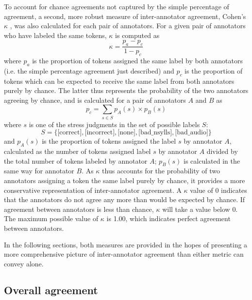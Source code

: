 		To account for chance agreements not captured by the simple percentage of agreement, a second, more robust measure of inter-annotator agreement, Cohen's $\kappa$ \citep{Cohen1960}, was also calculated for each pair of annotators. For a given pair of annotators who have labeled the same tokens, $\kappa$ is computed as
		\[
		\kappa = \frac{p_a-p_c}{1-p_c}
		\]
		where $p_a$ is the proportion of tokens assigned the same label by both annotators (i.e. the simple percentage agreement just described) and $p_c$ is the proportion of tokens which can be expected to receive the same label from both annotators purely by chance. The latter thus represents the probability of the two annotators agreeing by chance, and is calculated for a pair of annotators $A$ and $B$ as
		\[
		p_c = \sum_{s \in S} p_A(s) \times p_B(s)
		\]
		where $s$ is one of the stress judgments in the set of possible labels $S$:
		\[S = \{\text{[correct]}, \text{[incorrect]}, \text{[none]}, \text{[bad\_nsylls]}, \text{[bad\_audio]}\}\]
		and $p_A(s)$ is the proportion of tokens assigned the label $s$ by annotator $A$, calculated as the number of tokens assigned label $s$ by annotator $A$ divided by the total number of tokens labeled by annotator $A$; $p_B(s)$ is calculated in the same way for annotator $B$.
		As $\kappa$ thus accounts for the probability of two annotators assigning a token the same label purely by chance, it provides a more conservative representation of inter-annotator agreement. A $\kappa$ value of 0 indicates that the annotators do not agree any more than would be expected by chance. If agreement between annotators is less than chance, $\kappa$ will take a value below 0. The maximum possible value of $\kappa$ is 1.00, which indicates perfect agreement between annotators.
		
		In the following sections, both measures are provided in the hopes of presenting a more comprehensive picture of inter-annotator agreement than either metric can convey alone.  
		
		
		\subsection{Overall agreement}
		\label{sec:agreement:overall}
		
